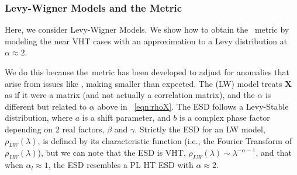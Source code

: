 %
%
%


\subsubsection{Levy-Wigner Models and the \ALPHAHAT Metric}

Here, we consider Levy-Wigner Models.
We show how to obtain the \WW~\ALPHAHAT metric by modeling the near VHT cases with an approximation to a Levy distribution at $\alpha\approx 2$.  

We do this because the~\ALPHAHAT metric has been developed to adjust for \SCALE anomalies that arise from issues like \CorrelationTraps,
making \ALPHA smaller than expected.
The  \LevyWigner (LW) model treats  $\mathbf{X}$ as if it were a \Wigner matrix (and not actually a correlation  matrix), and the $\alpha$ is different but related to $\alpha$ above in \EQN~\ref{eqn:rhoX}.
The ESD follows a Levy-Stable distribution, where $a$ is a shift parameter, and $b$ is a complex phase factor depending on 2 real factors, $\beta$ and $\gamma$.
Strictly the ESD for an LW model, $\rho_{LW}(\lambda)$, is defined by its characteristic function (i.e., the Fourier Transform of $\rho_{LW}(\lambda)$), but
we can note that the ESD is VHT, $\rho_{LW}(\lambda)\sim\lambda^{-\alpha-1}$, and that when $\alpha_{l}\approx 1$, the ESD resembles a PL HT ESD with $\alpha\approx 2$.

